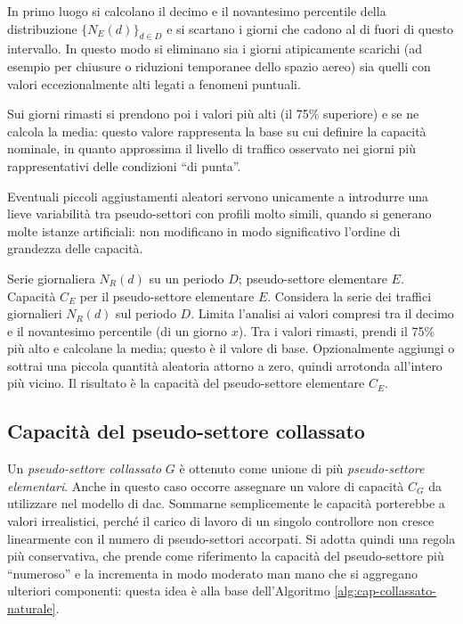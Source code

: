 In primo luogo si calcolano il decimo e il novantesimo percentile della distribuzione \(\{N_E(d)\}_{d \in D}\) e si scartano i giorni che cadono al di fuori di questo intervallo. In questo modo si eliminano sia i giorni atipicamente scarichi (ad esempio per chiusure o riduzioni temporanee dello spazio aereo) sia quelli con valori eccezionalmente alti legati a fenomeni puntuali.  

Sui giorni rimasti si prendono poi i valori più alti (il 75\% superiore) e se ne calcola la media: questo valore rappresenta la base su cui definire la capacità nominale, in quanto approssima il livello di traffico osservato nei giorni più rappresentativi delle condizioni “di punta”.

Eventuali piccoli aggiustamenti aleatori servono unicamente a introdurre una lieve variabilità tra pseudo-settori con profili molto simili, quando si generano molte istanze artificiali: non modificano in modo significativo l’ordine di grandezza delle capacità.

    \begin{algorithm}[H]
      \caption{Capacità di un pseudo-settore elementare.}
      \label{alg:cap-elementare-naturale}
      \begin{algorithmic}[1]
        \Require Serie giornaliera $N_R(d)$ su un periodo $D$; pseudo-settore elementare $E$.
        \Ensure Capacità $C_{E}$ per il pseudo-settore elementare $E$.
        \EnsureEndSkip{}
        \State Considera la serie dei traffici giornalieri $N_R(d)$ sul periodo $D$.
        \State Limita l’analisi ai valori compresi tra il decimo e il novantesimo percentile (di un giorno $x$).
        \State Tra i valori rimasti, prendi il 75\% più alto e calcolane la media; questo è il valore di base.
        \State Opzionalmente aggiungi o sottrai una piccola quantità aleatoria attorno a zero, quindi arrotonda all’intero più vicino. Il risultato è la capacità del pseudo-settore elementare $C_E$.
      \end{algorithmic}
    \end{algorithm}
    
    \subsection{Capacità del pseudo-settore collassato}
    Un \emph{pseudo-settore collassato} \(G\) è ottenuto come unione di più \emph{pseudo-settore elementari}. Anche in questo caso occorre assegnare un valore di capacità \(C_G\) da utilizzare nel modello di \gls{dac}.  
Sommarne semplicemente le capacità porterebbe a valori irrealistici, perché il carico di lavoro di un singolo controllore non cresce linearmente con il numero di pseudo-settori accorpati. Si adotta quindi una regola più conservativa, che prende come riferimento la capacità del pseudo-settore più “numeroso” e la incrementa in modo moderato man mano che si aggregano ulteriori componenti: questa idea è alla base dell'Algoritmo \ref{alg:cap-collassato-naturale}.


